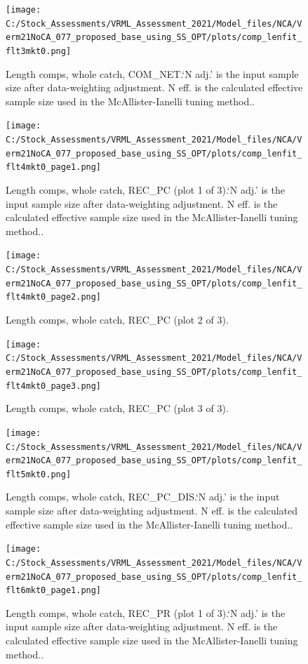 \documentclass[11pt,
  english,
  a4paper,
]{article}
\begin{document}
\begin{figure}
\centering
\texttt{[image: C:/Stock\_Assessments/VRML\_Assessment\_2021/Model\_files/NCA/Verm21NoCA\_077\_proposed\_base\_using\_SS\_OPT/plots/comp\_lenfit\_flt3mkt0.png]}
\caption{Length comps, whole catch, COM\_NET.`N adj.' is the input sample size after data-weighting adjustment. N eff. is the calculated effective sample size used in the McAllister-Ianelli tuning method..\label{fig:comp_lenfit_flt3mkt0}}
\end{figure}

\begin{figure}
\centering
\texttt{[image: C:/Stock\_Assessments/VRML\_Assessment\_2021/Model\_files/NCA/Verm21NoCA\_077\_proposed\_base\_using\_SS\_OPT/plots/comp\_lenfit\_flt4mkt0\_page1.png]}
\caption{Length comps, whole catch, REC\_PC (plot 1 of 3).`N adj.' is the input sample size after data-weighting adjustment. N eff. is the calculated effective sample size used in the McAllister-Ianelli tuning method..\label{fig:comp_lenfit_flt4mkt0_page1}}
\end{figure}

\begin{figure}
\centering
\texttt{[image: C:/Stock\_Assessments/VRML\_Assessment\_2021/Model\_files/NCA/Verm21NoCA\_077\_proposed\_base\_using\_SS\_OPT/plots/comp\_lenfit\_flt4mkt0\_page2.png]}
\caption{Length comps, whole catch, REC\_PC (plot 2 of 3).\label{fig:comp_lenfit_flt4mkt0_page2}}
\end{figure}

\begin{figure}
\centering
\texttt{[image: C:/Stock\_Assessments/VRML\_Assessment\_2021/Model\_files/NCA/Verm21NoCA\_077\_proposed\_base\_using\_SS\_OPT/plots/comp\_lenfit\_flt4mkt0\_page3.png]}
\caption{Length comps, whole catch, REC\_PC (plot 3 of 3).\label{fig:comp_lenfit_flt4mkt0_page3}}
\end{figure}

\begin{figure}
\centering
\texttt{[image: C:/Stock\_Assessments/VRML\_Assessment\_2021/Model\_files/NCA/Verm21NoCA\_077\_proposed\_base\_using\_SS\_OPT/plots/comp\_lenfit\_flt5mkt0.png]}
\caption{Length comps, whole catch, REC\_PC\_DIS.`N adj.' is the input sample size after data-weighting adjustment. N eff. is the calculated effective sample size used in the McAllister-Ianelli tuning method..\label{fig:comp_lenfit_flt5mkt0}}
\end{figure}

\begin{figure}
\centering
\texttt{[image: C:/Stock\_Assessments/VRML\_Assessment\_2021/Model\_files/NCA/Verm21NoCA\_077\_proposed\_base\_using\_SS\_OPT/plots/comp\_lenfit\_flt6mkt0\_page1.png]}
\caption{Length comps, whole catch, REC\_PR (plot 1 of 3).`N adj.' is the input sample size after data-weighting adjustment. N eff. is the calculated effective sample size used in the McAllister-Ianelli tuning method..\label{fig:comp_lenfit_flt6mkt0_page1}}
\end{figure}
\end{document}
